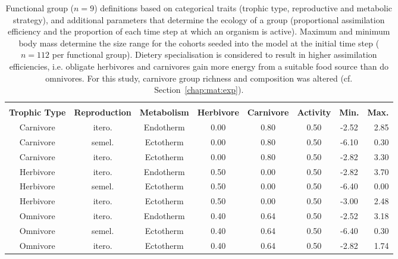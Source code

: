 \begin{sidewaystable}[htb!]
\centering
\caption[Functional group definitions]{Functional group ($n = 9$) definitions based on categorical traits (trophic type, reproductive and metabolic strategy),
               and additional parameters that determine the ecology of a group (proportional assimilation efficiency and the proportion of each time step
               at which an organism is active). Maximum and minimum body mass determine the size range for the cohorts seeded into the model at the initial time step ($n = 112$ per functional group). Dietery specialisation is considered to result in higher assimilation efficiencies, i.e. obligate herbivores and carnivores gain more energy from a suitable food source than do omnivores. For this study, carnivore group richness and composition was altered (cf. Section~\ref{chap:mat:exp}).} 
\label{tab:mat:madingley:func}
\begin{tabulary}{\textwidth}{CCCCCCCR}
  \toprule
  & & &  & &  \\ \cmidrule(lr){4-5} \cmidrule(lr){7-8} 
\textbf{Trophic Type} & \textbf{Reproduction} & \textbf{Metabolism} & \textbf{Herbivore} & \textbf{Carnivore} & \textbf{Activity} & \textbf{Min.} & \textbf{Max.} \\ 
  \midrule
Carnivore & itero. & Endotherm & 0.00 & 0.80 & 0.50 & -2.52 & 2.85 \\ 
  Carnivore & semel. & Ectotherm & 0.00 & 0.80 & 0.50 & -6.10 & 0.30 \\ 
  Carnivore & itero. & Ectotherm & 0.00 & 0.80 & 0.50 & -2.82 & 3.30 \\ 
   [1ex]Herbivore & itero. & Endotherm & 0.50 & 0.00 & 0.50 & -2.82 & 3.70 \\ 
  Herbivore & semel. & Ectotherm & 0.50 & 0.00 & 0.50 & -6.40 & 0.00 \\ 
  Herbivore & itero. & Ectotherm & 0.50 & 0.00 & 0.50 & -3.00 & 2.48 \\ 
   [1ex]Omnivore & itero. & Endotherm & 0.40 & 0.64 & 0.50 & -2.52 & 3.18 \\ 
  Omnivore & semel. & Ectotherm & 0.40 & 0.64 & 0.50 & -6.40 & 0.30 \\ 
  Omnivore & itero. & Ectotherm & 0.40 & 0.64 & 0.50 & -2.82 & 1.74 \\ 
   \bottomrule
\end{tabulary}
\end{sidewaystable}
